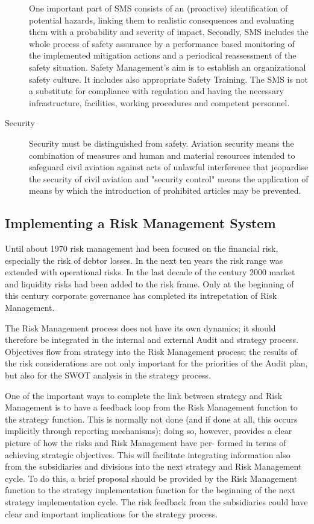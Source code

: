 \documentclass[a4paper, 10pt]{article}
\begin{document}
\begin{description}
				One important part of SMS consists of an (proactive) identification of potential hazards, linking
				them to realistic consequences and evaluating them with a probability and severity of impact.
				Secondly, SMS includes the whole process of safety assurance by a performance based
				monitoring of the implemented mitigation actions and a periodical reassessment of the safety
				situation. Safety Management's aim is to establish an organizational safety culture. It includes
				also appropriate Safety Training. The SMS is not a substitute for compliance with regulation
				and having the necessary infrastructure, facilities, working procedures and competent personnel.
		\item[Security] Security must be distinguished from safety. Aviation security means the combination of measures 
				and human and material resources intended to safeguard civil aviation against acts of unlawful interference that
				jeopardise the security of civil aviation and "security control" means the application of means
				by which the introduction of prohibited articles may be prevented.
\end{description}

\subsection{Implementing a Risk Management System}
Until about 1970 risk management had been focused on the financial risk, especially the risk
of debtor losses. In the next ten years the risk range was extended with operational risks. In
the last decade of the century 2000 market and liquidity risks had been added to the risk
frame. Only at the beginning of this century corporate governance has completed its intrepetation of Risk Management.\par

The Risk Management process does not have its own dynamics; it should therefore be integrated 
in the internal and external Audit and strategy process. Objectives flow from strategy
into the Risk Management process; the results of the risk considerations are not only important
for the priorities of the Audit plan, but also for the SWOT analysis in the strategy process.\par

One of the important ways to complete the link between strategy and Risk Management is to
have a feedback loop from the Risk Management function to the strategy function. This is
normally not done (and if done at all, this occurs implicitly through reporting mechanisms);
doing so, however, provides a clear picture of how the risks and Risk Management have per-
formed in terms of achieving strategic objectives. This will facilitate integrating information
also from the subsidiaries and divisions into the next strategy and Risk Management cycle. To
do this, a brief proposal should be provided by the Risk Management function to the strategy
implementation function for the beginning of the next strategy implementation cycle. The risk
feedback from the subsidiaries could have clear and important implications for the strategy
process.\par
\end{document}

